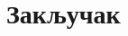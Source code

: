 \documentclass[11pt, a4paper]{article}
\theoremstyle{remark}
\numberwithin{equation}{section}
\begin{document}
	\begin{comment}
	Примећујемо опет исте односе између редова. Фибоначијев хип заостаје за хипом, а биномни хип никако не може да постине боље време. Као једина могућа алтернатива хипу и даље остаје сплеј стабло. Ван Емде Боасово стабло се показало као најмање ефикасна структура података.
	\end{comment}
	
	\newpage
	
	\section{Закључак}
	
	\begin{comment}
	Главни циљ овог мотурског рада је био да представи теоријски најјефикасније структуре података за имплементацију Дајкстриног и Примовог алгоритма, као два графовска алгоритма који се доста користе, како у пракси тако и у такмичарском програмираму. Поред операција које се директно користе у овим алгоритмима, описане су и све друге подржане операције. \\
	Приликом израде самог рада коришћена је сва доступна литература. Евидентно, адекватне литературе на срспком језику нема, па овај рад између осталог то може да поправи. \\
	
	Између бинарног хипа и хипа неког другог степена, готово да разлика не постоји. У графовима у којима је $m=O(n)$ $d$--хип може готово да се поистовети са бинарним хипом. Већа разлика би се уочила при јако великим графовима, али питање је колико се често такви графови јављају у пракси. Степен хипа је корисно увећати када је $m=O(n^2)$. \\
	\indent У поређењу са другим структурама података, бинарни хип односи апсолутну победу. Константа која је сакривена иза $O$ нотације има огроман утицај и из тог разлога су остали редови готово неприменљиви. Евентуално би сплеј стабло могло да се пореди са хипом, али чак и тада је бинарни хип бржи или је разлика неосетна. Треба имати у виду да већина језика има уграђен бинарни хип као основну варијанту приоритетног реда, па је далеко лакши за употребу од сплеј стабла или хипа неког другог степена. \\
	
	\textbf{На основу анализираних резултата, закључујемо да је бинарни хип најефикаснији приоритетни ред за имплементацију Дајкстриног и Примовог алгоритма}.
	\end{comment}
	
\end{document}
